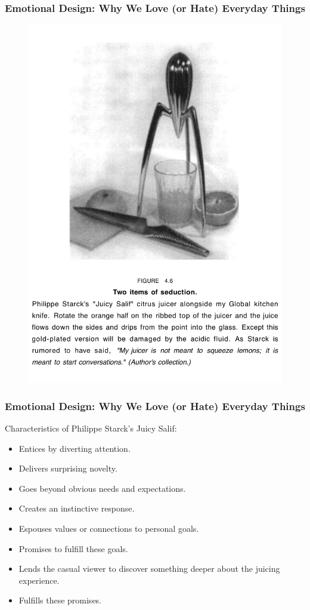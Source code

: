 \documentclass[screen, aspectratio=169]{beamer}
\begin{document}
%
\begin{frame}
\frametitle{Emotional Design: Why We Love (or Hate) Everyday Things}
 \begin{figure}
	\includegraphics[scale=0.23]{img/Donald-Norman-juicer.pdf}
    \end{figure}
\end{frame}
%
\begin{frame}
\frametitle{Emotional Design: Why We Love (or Hate) Everyday Things}
Characteristics of Philippe Starck's Juicy Salif:
\begin{itemize}
\item Entices by diverting attention.
\item Delivers surprising novelty.
\item Goes beyond obvious needs and expectations.
\item Creates an instinctive response.
\item Espouses values or connections to personal goals.
\item Promises to fulfill these goals.
\item Lends the casual viewer to discover something deeper about the juicing experience.
\item Fulfills these promises.
\end{itemize} 
\end{frame}
\end{document}
